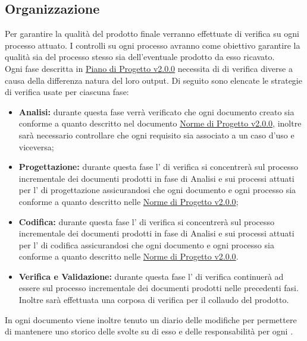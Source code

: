 \documentclass{scalatekids-article}
\begin{document}
\subsection{Organizzazione}
Per garantire la qualità del prodotto finale verranno effettuate  di verifica su ogni processo attuato. I controlli su ogni processo avranno come obiettivo garantire la qualità sia del processo stesso sia dell'eventuale prodotto da esso ricavato.\\
Ogni fase descritta in \href{run:./PianoDiProgetto\_v2.0.0.pdf}{Piano di Progetto v2.0.0} necessita di  di verifica diverse a causa della differenza natura del loro output. Di seguito sono elencate le strategie di verifica usate per ciascuna fase:
\begin{itemize}
\item\textbf{Analisi:} durante questa fase verrà verificato che ogni documento creato sia conforme a quanto descritto nel documento \href{run:../Interni/NormeDiProgetto\_v2.0.0.pdf}{Norme di Progetto v2.0.0}, inoltre sarà necessario controllare che ogni requisito sia associato a un caso d'uso e viceversa;
\item\textbf{Progettazione:} durante questa fase l' di verifica si concentrerà sul processo incrementale dei documenti prodotti in fase di Analisi e sui processi attuati per l' di progettazione assicurandosi che ogni documento e ogni processo sia conforme a quanto descritto nelle \href{run:../Interni/NormeDiProgetto\_v2.0.0.pdf}{Norme di Progetto v2.0.0};
\item\textbf{Codifica:} durante questa fase l' di verifica si concentrerà sul processo incrementale dei documenti prodotti in fase di Analisi e sui processi attuati per l' di codifica assicurandosi che ogni documento e ogni processo sia conforme a quanto descritto nelle \href{run:../Interni/NormeDiProgetto\_v2.0.0.pdf}{Norme di Progetto v2.0.0}.
\item\textbf{Verifica e Validazione:} durante questa fase l' di verifica continuerà ad essere sul processo incrementale dei documenti prodotti nelle precedenti fasi. Inoltre sarà effettuata una corposa  di verifica per il collaudo del prodotto.
\end{itemize}
In ogni documento viene inoltre tenuto un diario delle modifiche per permettere di mantenere uno storico delle  svolte su di esso e delle responsabilità per ogni .
\end{document}
